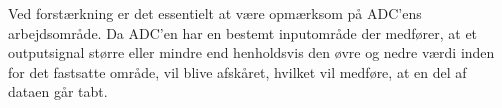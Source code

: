 Ved forstærkning er det essentielt at være opmærksom på ADC'ens  arbejdsområde. 
Da ADC'en har en bestemt inputområde der medfører, at et outputsignal større eller mindre end
henholdsvis den øvre og nedre værdi inden for det fastsatte område, vil blive afskåret, hvilket
vil medføre, at en del af dataen går tabt.
 




 